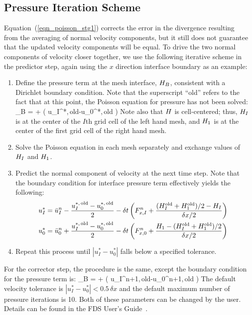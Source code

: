 \subsection{Pressure Iteration Scheme}
\label{section:pressure_iteration}

Equation~(\ref{eqn_poisson_stg1}) corrects the error in the divergence resulting from the averaging of normal velocity components, but it still does not guarantee that the
updated velocity components will be equal. To drive the two normal components of velocity closer together, we use the
following iterative scheme in the predictor step, again using the $x$ direction interface boundary as an example:
\begin{enumerate}
\item Define the pressure term at the mesh interface, $H_B$, consistent with a Dirichlet boundary condition. Note that the superscript ``old'' refers to the fact that at this point, the Poisson equation for pressure has not been solved:
\be
   \cH_B =  +  \left( u_I^{*,\,{\rm old}}-u_0^{*,\,{\rm old}} \right)
\ee
Note also that $H$ is cell-centered; thus, $H_I$ is at the center of the $I$th grid cell of the left hand mesh, and $H_1$ is at the center of the first grid cell of the right hand mesh.
\item Solve the Poisson equation in each mesh separately and exchange values of $H_I$ and $H_1$.
\item Predict the normal component of velocity at the next time step. Note that the boundary condition for interface pressure term effectively yields the following:
\begin{align}
   u_I^* &= \bar{u}_I^n - \frac{u_I^{\rm *,\, old}-u_0^{\rm *,\, old}}{2} - \delta t \left( F_{x,I}^{n} + \frac{ (H_I^{\rm old}+H_1^{\rm old})/2 - H_I }{ \delta x/2} \right) \label{uI} \\
   u_0^* &= \bar{u}_0^n + \frac{u_I^{\rm *,\, old}-u_0^{\rm *,\, old}}{2} - \delta t \left( F_{x,0}^{n} + \frac{ H_1 - (H_I^{\rm old}+H_1^{\rm old})/2 }{ \delta x/2} \right) \label{u0}
\end{align}
\item Repeat this process until $\left| u_I^* - u_0^* \right|$ falls below a specified tolerance.
\end{enumerate}
For the corrector step, the procedure is the same, except the boundary condition for the pressure term is:
\be
   \cH_B =  +  \left( u_I^{n+1,\,{\rm old}}-u_0^{n+1,\,{\rm old}} \right)
\ee
The default velocity tolerance is $\left| u_I^* - u_0^* \right| < 0.5 \, \delta x$ and the default maximum number of pressure iterations is 10.  Both of these parameters can be changed by the user. Details can be found in the FDS User's Guide~\cite{FDS_Users_Guide}.




